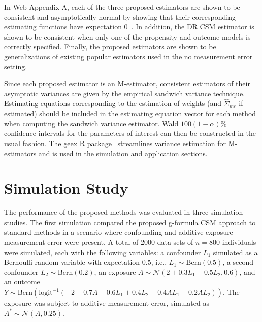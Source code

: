 \documentclass[useAMS,usenatbib,referee]{biom}
\begin{document}
In Web Appendix A, each of the three proposed estimators are shown to be consistent and asymptotically normal by showing that their corresponding estimating functions have expectation 0~\citep{stefanski2002}. In addition, the DR CSM estimator is shown to be consistent when only one of the propensity and outcome models is correctly specified. Finally, the proposed estimators are shown to be generalizations of existing popular estimators used in the no measurement error setting.

Since each proposed estimator is an M-estimator, consistent estimators of their asymptotic variances are given by the empirical sandwich variance technique. Estimating equations corresponding to the estimation of weights (and $\hat{\Sigma}_{me}$ if estimated) should be included in the estimating equation vector for each method when computing the sandwich variance estimator. Wald $100(1-\alpha)\%$ confidence intervals for the parameters of interest can then be constructed in the usual fashion. The geex R package~\citep{saul2017} streamlines variance estimation for M-estimators and is used in the simulation and application sections.

\section{Simulation Study}

The performance of the proposed methods was evaluated in three simulation studies. The first simulation compared the proposed g-formula CSM approach to standard methods in a scenario where confounding and additive exposure measurement error were present. A total of 2000 data sets of $n = 800$ individuals were simulated, each with the following variables: a confounder $L_{1}$ simulated as a Bernoulli random variable with expectation $0.5$, i.e., $L_{1} \sim \text{Bern}(0.5)$, a second confounder $L_{2} \sim \text{Bern}(0.2)$, an exposure $A \sim \mathcal{N}(2 + 0.3L_{1} - 0.5L_{2}, 0.6)$, and an outcome $Y \sim \text{Bern}(\text{logit}^{-1}(-2 + 0.7A - 0.6L_{1} + 0.4L_{2} - 0.4AL_{1} - 0.2AL_{2}))$. The exposure was subject to additive measurement error, simulated as $A^{*} \sim \mathcal{N}(A, 0.25)$.
\end{document}
